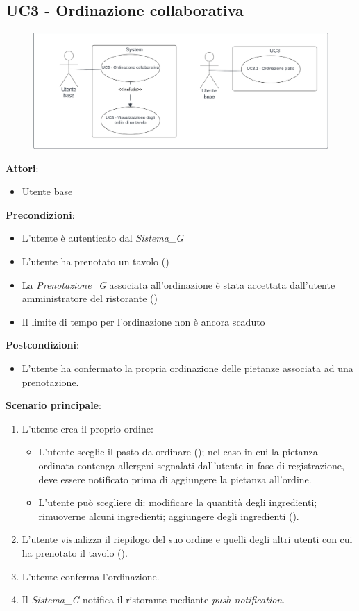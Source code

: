 \subsection{UC3 - Ordinazione collaborativa}\label{usecase:3}

\begin{figure}[H]
    \centering
    \includegraphics[width=0.9\linewidth]{ucd/UCD3_nuovo.png}
\end{figure}

\textbf{Attori}:
\begin{itemize}
    \item Utente base
\end{itemize}
\textbf{Precondizioni}:
\begin{itemize}
    \item L'utente è autenticato dal \textit{Sistema_G} 
    \item L'utente ha prenotato un tavolo ()
    \item La \textit{Prenotazione_G} associata all'ordinazione è stata accettata dall'utente amministratore del ristorante ()
    \item Il limite di tempo per l'ordinazione non è ancora scaduto
\end{itemize}
\textbf{Postcondizioni}:
\begin{itemize}
    \item L'utente ha confermato la propria ordinazione delle pietanze associata ad una prenotazione.
\end{itemize}
\textbf{Scenario principale}:
\begin{enumerate}
    \item L'utente crea il proprio ordine:
    \begin{itemize}
    \item L'utente sceglie il pasto da ordinare (); nel caso in cui la pietanza ordinata contenga allergeni segnalati dall'utente in fase di registrazione, deve essere notificato prima di  aggiungere la pietanza all'ordine.
    \item L'utente può scegliere di: modificare la quantità degli ingredienti; rimuoverne alcuni ingredienti; aggiungere degli ingredienti ().
    \end{itemize}
    \item L'utente visualizza il riepilogo del suo ordine e quelli degli altri utenti con cui ha prenotato il tavolo ().
    \item L'utente conferma l'ordinazione.
    \item Il \textit{Sistema_G} notifica il ristorante mediante \textit{push-notification}.
\end{enumerate}


